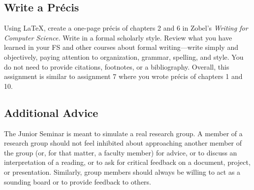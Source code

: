 
\usepackage[compact]{titlesec}





\subsection*{Write a Pr\'{e}cis} 

Using \LaTeX, create a one-page pr\'{e}cis of chapters 2 and 6 in Zobel's {\em Writing for Computer Science.} Write in a
formal scholarly style. Review what you have learned in your FS and other courses about formal writing---write simply
and objectively, paying attention to organization, grammar, spelling, and style. You do not need to provide citations,
footnotes, or a bibliography. Overall, this assignment is similar to assignment 7 where you wrote pr\'{e}cis of chapters
1 and 10. 


\subsection*{Additional Advice}

The Junior Seminar is meant to simulate a real research group.  A member of a research group should not feel inhibited
about approaching another member of the group (or, for that matter, a faculty member) for advice, or to discuss an
interpretation of a reading, or to ask for critical feedback on a document, project, or presentation.  Similarly, group
members should always be willing to act as a sounding board or to provide feedback to others.  


